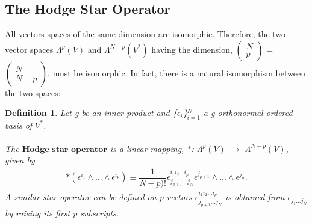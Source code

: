 \documentclass[12pt,a4paper]{article}
\newtheorem{defn}[thm]{Definition}
\begin{document}
\subsection{The Hodge Star Operator}
All vectors spaces of the same dimension are isomorphic. Therefore, the two vector spaces $\Lambda^{p}(V)$ and $\Lambda^{N-p}(V^*)$ having the dimension, $\begin{pmatrix}
N\\
p
\end{pmatrix}$ = $\begin{pmatrix}
N\\
N-p
\end{pmatrix}$, must be isomorphic. In fact, there is a natural isomorphism between the two spaces:
\begin{defn} \label{star}
Let g be an inner product and \{$\epsilon_i$\}$^N_{i=1}$  a g-orthonormal ordered basis of $V^*$. \\\\The $\textbf{Hodge star operator}$ is a linear mapping, $\ast$: $\Lambda^{p}(V)$ $\to$ $\Lambda^{N-p}(V)$, given by
\begin{eqnarray*} 
\ast (\epsilon^{i_1} \wedge ... \wedge \epsilon^{i_p}) \equiv \dfrac{1}{N - p)!} \epsilon^{i_1 i_2 ... i_p}_{j_{p+1}... j_N} \epsilon^{j_{p+1} }\wedge ... \wedge \epsilon^{j_n}.
\end{eqnarray*} 
A similar star operator can be defined on p-vectors $\epsilon^{i_1 i_2 ... i_p}_{j_{p+1}... j_N}$ is obtained
from $\epsilon_{j_1...j_N}$ by raising its first p subscripts.\\
\end{defn}
\end{document}
